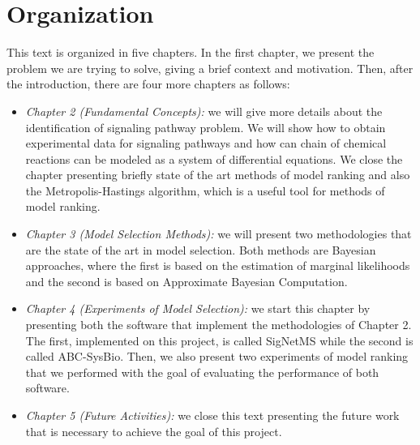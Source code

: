 \section{Organization}
This text is organized in five chapters. In the first chapter, we 
present the problem we are trying to solve, giving a brief context
and motivation. Then, after the introduction, there are four more 
chapters as follows:

\begin{itemize}
    \item{\em Chapter 2 (Fundamental Concepts):} we will give more details
        about the identification of signaling pathway problem. We will
        show how to obtain experimental data for signaling pathways and
        how can chain of chemical reactions can be modeled as a system 
        of differential equations. We close the chapter presenting 
        briefly state of the art methods of model ranking and also the 
        Metropolis-Hastings algorithm, which is a useful tool for 
        methods of model ranking.
    \item{\em Chapter 3 (Model Selection Methods):} we will present two
        methodologies that are the state of the art in model selection.
        Both methods are Bayesian approaches, where the first is based
        on the estimation of marginal likelihoods and the second is
        based on Approximate Bayesian Computation.
    \item{\em Chapter 4 (Experiments of Model Selection):} we start this
        chapter by presenting both the software that implement the 
        methodologies of Chapter 2. The first, implemented on this 
        project, is called SigNetMS while the second is called 
        ABC-SysBio. Then, we also present two experiments of model 
        ranking that we performed with the goal of evaluating the 
        performance of both software.
    \item{\em Chapter 5 (Future Activities):} we close this text 
        presenting the future work that is necessary to achieve the goal
        of this project.
\end{itemize}
